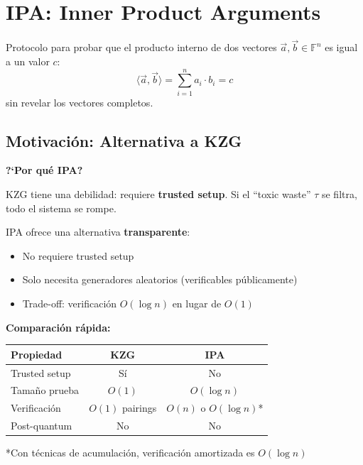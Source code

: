 \documentclass[11pt,a4paper,twoside]{book}
\begin{document}
\section{IPA: Inner Product Arguments}

\begin{definition}
Protocolo para probar que el producto interno de dos vectores $\vec{a}, \vec{b} \in \mathbb{F}^n$ es igual a un valor $c$:
\[ \langle \vec{a}, \vec{b} \rangle = \sum_{i=1}^{n} a_i \cdot b_i = c \]
sin revelar los vectores completos.
\end{definition}

\subsection{Motivaci\'on: Alternativa a KZG}

\begin{intuicion}
\textbf{?`Por qu\'e IPA?}

KZG tiene una debilidad: requiere \textbf{trusted setup}. Si el ``toxic waste'' $\tau$ se filtra, todo el sistema se rompe.

IPA ofrece una alternativa \textbf{transparente}:
\begin{itemize}
    \item No requiere trusted setup
    \item Solo necesita generadores aleatorios (verificables p\'ublicamente)
    \item Trade-off: verificaci\'on $O(\log n)$ en lugar de $O(1)$
\end{itemize}

\textbf{Comparaci\'on r\'apida:}
\begin{center}
\begin{tabular}{lcc}
\toprule
\textbf{Propiedad} & \textbf{KZG} & \textbf{IPA} \\
\midrule
Trusted setup & S\'i & No \\
Tama\~no prueba & $O(1)$ & $O(\log n)$ \\
Verificaci\'on & $O(1)$ pairings & $O(n)$ o $O(\log n)$* \\
Post-quantum & No & No \\
\bottomrule
\end{tabular}
\end{center}
\small{*Con t\'ecnicas de acumulaci\'on, verificaci\'on amortizada es $O(\log n)$}
\end{intuicion}
\end{document}
